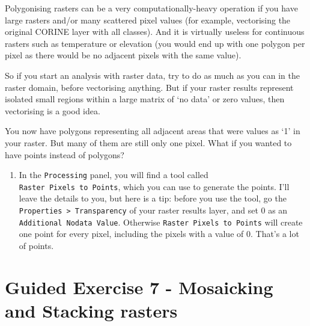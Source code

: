 \documentclass[
  letterpaper,
  DIV=11,
  numbers=noendperiod]{scrreprt}
\providecommand{\tightlist}{%
  \setlength{\itemsep}{0pt}\setlength{\parskip}{0pt}}\usepackage{longtable,booktabs,array}
\begin{document}
\begin{tcolorbox}[enhanced jigsaw, coltitle=black, toprule=.15mm, breakable, opacitybacktitle=0.6, left=2mm, colback=white, leftrule=.75mm, rightrule=.15mm, colbacktitle=quarto-callout-warning-color!10!white, toptitle=1mm, titlerule=0mm, colframe=quarto-callout-warning-color-frame, arc=.35mm, bottomtitle=1mm, opacityback=0, bottomrule=.15mm, title=\textcolor{quarto-callout-warning-color}{\faExclamationTriangle}\hspace{0.5em}{Warning}]

Polygonising rasters can be a very computationally-heavy operation if
you have large rasters and/or many scattered pixel values (for example,
vectorising the original CORINE layer with all classes). And it is
virtually useless for continuous rasters such as temperature or
elevation (you would end up with one polygon per pixel as there would be
no adjacent pixels with the same value).

So if you start an analysis with raster data, try to do as much as you
can in the raster domain, before vectorising anything. But if your
raster results represent isolated small regions within a large matrix of
`no data' or zero values, then vectorising is a good idea.

\end{tcolorbox}

You now have polygons representing all adjacent areas that were values
as `1' in your raster. But many of them are still only one pixel. What
if you wanted to have points instead of polygons?

\begin{enumerate}
\def\labelenumi{(\arabic{enumi})}
\setcounter{enumi}{174}
\tightlist
\item
  In the \texttt{Processing} panel, you will find a tool called
  \texttt{Raster\ Pixels\ to\ Points}, which you can use to generate the
  points. I'll leave the details to you, but here is a tip: before you
  use the tool, go the \texttt{Properties\ \textgreater{}\ Transparency}
  of your raster results layer, and set 0 as an
  \texttt{Additional\ Nodata\ Value}. Otherwise
  \texttt{Raster\ Pixels\ to\ Points} will create one point for every
  pixel, including the pixels with a value of 0. That's a lot of points.
\end{enumerate}

\section{Guided Exercise 7 - Mosaicking and Stacking
rasters}\label{guided-exercise-7---mosaicking-and-stacking-rasters}
\end{document}
